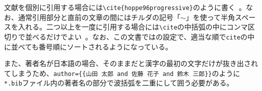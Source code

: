 文献を個別に引用する場合には\texttt{\textbackslash cite\{hoppe96progressive\}}のように書く~\cite{hoppe96progressive}。なお、通常引用部分と直前の文章の間にはチルダの記号「$\sim$」を使って半角スペースを入れる。二つ以上を一度に引用する場合には\texttt{\textbackslash cite}の中括弧の中にコンマ区切りで並べるだけでよい~\cite{garland97surface,kazhdan06poisson, hoppe96progressive,qi2017pointnetpp}。なお、この文書では\biblatex の設定で、適当な順で\texttt{cite}の中に並べても番号順にソートされるようになっている。

また、著者名が日本語の場合、そのままだと漢字の最初の文字だけが抜き出されてしまうため、\texttt{author=\{\{山田 太郎 and 佐藤 花子 and 鈴木 三郎\}\}}のように\texttt{*.bib}ファイル内の著者名の部分で波括弧を二重にして囲う必要がある。
